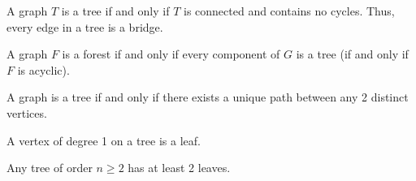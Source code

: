 \documentclass{article}
\begin{document}
\medskip{}

    A graph $T$ is a tree if and only if $T$ is connected and contains no cycles.
    Thus, every edge in a tree is a bridge.

\medskip{}

    A graph $F$ is a forest if and only if every component of $G$ is a tree (if and only if $F$ is acyclic).

\medskip{}

    A graph is a tree if and only if there exists a unique path between any 2 distinct vertices.

\medskip{}

    A vertex of degree 1 on a tree is a leaf.

\medskip{}

    Any tree of order $n \geq 2$ has at least 2 leaves.
\end{document}

